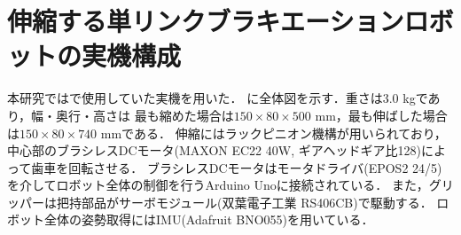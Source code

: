         
        \section{伸縮する単リンクブラキエーションロボットの実機構成}
          
          本研究では\cite{Hijiri:Robomech2024}で使用していた実機を用いた．
          に全体図を示す．重さは3.0 kgであり，幅・奥行・高さは
          最も縮めた場合は$150{\times}80{\times}500$ mm，最も伸ばした場合は$150{\times}80{\times}740$ mmである．
          伸縮にはラックピニオン機構が用いられており，中心部のブラシレスDCモータ(MAXON EC22 40W, ギアヘッドギア比128)によって歯車を回転させる．
          ブラシレスDCモータはモータドライバ(EPOS2 24/5)を介してロボット全体の制御を行うArduino Unoに接続されている．
          また，グリッパーは把持部品がサーボモジュール(双葉電子工業 RS406CB)で駆動する．
          ロボット全体の姿勢取得にはIMU(Adafruit BNO055)を用いている．
          

            
          
